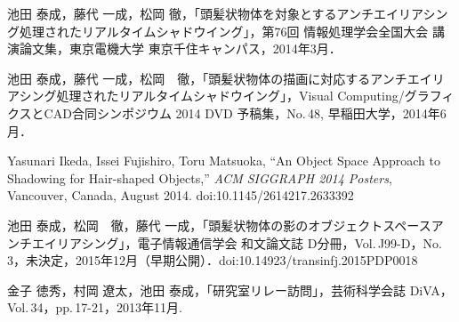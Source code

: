\renewcommand{\refname}{公開文献}	
%
\begin{thebibliography}{55}
%
池田 泰成，藤代 一成，松岡 徹，「頭髪状物体を対象とするアンチエイリアシング処理されたリアルタイムシャドウイング」，第76回 情報処理学会全国大会 講演論文集，東京電機大学 東京千住キャンパス，2014年3月．

池田 泰成，藤代 一成，松岡　徹，「頭髪状物体の描画に対応するアンチエイリアシング処理されたリアルタイムシャドウイング」，Visual Computing/グラフィクスとCAD合同シンポジウム 2014 DVD 予稿集，No.\,48, 早稲田大学，2014年6月．

Yasunari Ikeda, Issei Fujishiro, Toru Matsuoka, ``An Object Space Approach to Shadowing
for Hair-shaped Objects,'' \textit{ACM SIGGRAPH 2014 Posters}, Vancouver, Canada, August 2014. doi:10.1145/2614217.2633392

池田 泰成，松岡　徹，藤代 一成，「頭髪状物体の影のオブジェクトスペースアンチエイリアシング」，電子情報通信学会 和文論文誌 D分冊，Vol.\,J99-D，No.\,3，未決定，2015年12月（早期公開）．doi:10.14923/transinfj.2015PDP0018

金子 徳秀，村岡 遼太，池田 泰成，「研究室リレー訪問」，芸術科学会誌 DiVA，Vol.\,34，pp.\,17-21，2013年11月.

\end{thebibliography}